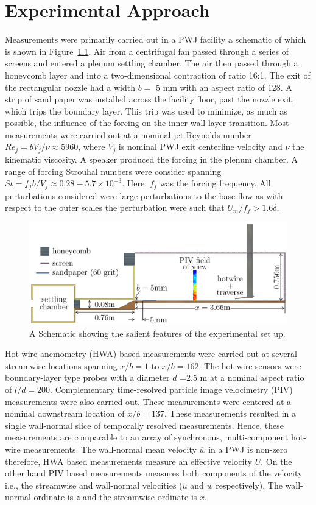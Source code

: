 \chapter{Experimental Approach}

Measurements were primarily carried out in a PWJ facility a schematic of which is shown in Figure~\ref{fg:expSet}. Air from a centrifugal fan passed through a series of screens and entered a plenum settling chamber. The air then passed through a honeycomb layer and into a two-dimensional contraction of ratio 16:1. The exit of the rectangular nozzle had a width $b =$  5 mm with an aspect ratio of 128. A strip of sand paper was installed across the facility floor, past the nozzle exit, which trips the boundary layer. This trip was used to minimize, as much as possible, the influence of the forcing on the inner wall layer transition. Most measurements were carried out at a nominal jet Reynolds number $Re_j = b V_j/ \nu \approx 5960$, where $V_j$ is nominal PWJ exit centerline velocity and $\nu$ the kinematic viscosity. A speaker produced the forcing in the plenum chamber. A range of forcing Strouhal numbers were consider spanning $St= f_fb/V_j \approx 0.28 - 5.7 \times 10^{-3}$. Here, $f_f$ was the forcing frequency. All perturbations considered were large-perturbations to the base flow as with respect to the outer scales the perturbation were such that $U_m/f_f>1.6 \delta$. 

\begin{figure}[h!]
	\centering
	\includegraphics[width=.99\textwidth]{pics/expSch.png}
	\caption{A Schematic showing the salient features of the experimental set up.}
	\label{fg:expSet}
\end{figure}

Hot-wire anemometry (HWA) based measurements were carried out at several streamwise locations spanning $x/b = 1$ to $x/b = 162$. The hot-wire sensors were boundary-layer type probes with a diameter $d$ =2.5 \textmu m at a nominal aspect ratio of $l/d = 200$. Complementary time-resolved particle image velocimetry (PIV) measurements were also carried out. These measurements were centered at a nominal downstream location of $x/b=137$. These measurements resulted in a single wall-normal slice of temporally resolved measurements. Hence, these measurements  are comparable to an array of synchronous, multi-component hot-wire measurements. The wall-normal mean velocity $\overline{w}$ in a PWJ is non-zero therefore, HWA based measurements measure an effective velocity $U$. On the other hand PIV based measurements measures both components of the velocity i.e., the streamwise and wall-normal velocities ($u$ and $w$ respectively). The wall-normal ordinate is $z$ and the streamwise ordinate is $x$. 

